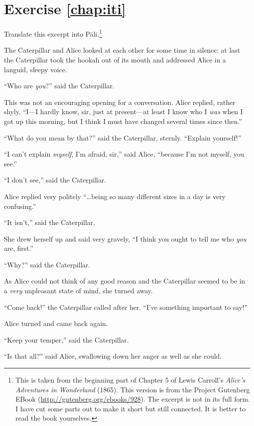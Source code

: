 \section*{Exercise \ref{chap:iti}}
Translate this excerpt into P\=ali.\footnote{This is taken from the beginning part of Chapter 5 of Lewis Carroll's \emph{Alice's Adventures in Wonderland} (1865). This version is from the Project Gutenberg EBook (\url{http://gutenberg.org/ebooks/928}). The excerpt is not in its full form. I have cut some parts out to make it short but still connected. It is better to read the book yourselves.}
\begin{compactenum}
\item The Caterpillar and Alice looked at each other for some time in silence: at last the Caterpillar took the hookah out of its mouth and addressed Alice in a languid, sleepy voice.
\item ``Who are \emph{you}?'' said the Caterpillar.
\item This was not an encouraging opening for a conversation. Alice replied, rather shyly, ``I---I hardly know, sir, just at present---at least I know who I \emph{was} when I got up this morning, but I think I must have changed several times since then.''
\item ``What do you mean by that?'' said the Caterpillar, sternly. ``Explain yourself!''
\item ``I can't explain \emph{myself}, I'm afraid, sir,'' said Alice, ``because I'm not myself, you see.''
\item ``I don't see,'' said the Caterpillar.
\item Alice replied very politely ``\ldots being so many different sizes in a day is very confusing.''
\item ``It isn't,'' said the Caterpillar.
\item She drew herself up and said very gravely, ``I think you ought to tell me who \emph{you} are, first.''
\item ``Why?'' said the Caterpillar.
\item As Alice could not think of any good reason and the Caterpillar seemed to be in a \emph{very} unpleasant state of mind, she turned away.
\item ``Come back!'' the Caterpillar called after her. ``I've something important to say!''
\item Alice turned and came back again.
\item ``Keep your temper,'' said the Caterpillar.
\item ``Is that all?'' said Alice, swallowing down her anger as well as she could.

\end{compactenum}
